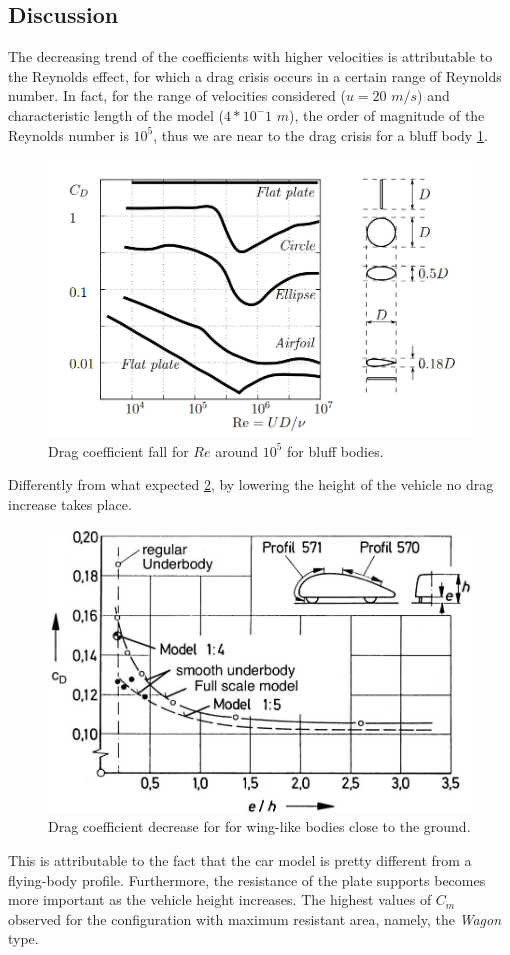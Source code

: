 \documentclass{elbioimp2}
\begin{document}
\subsection{Discussion}
The decreasing trend of the coefficients with higher velocities is attributable to the Reynolds effect, for which a drag crisis occurs in a certain range of Reynolds number. In fact, for the range of velocities considered ($u = 20$ $m/s$) and characteristic length of the model ($4*10^-1$ $m$), the order of magnitude of the Reynolds number is $10^5$, thus we are near to the drag crisis for a bluff body \cite{dragcrisis} \ref{dragcrisis}.
    \begin{figure}[htp]
        \centering
        \includegraphics[width=1\columnwidth]{dragcrisis.png}
        \caption{Drag coefficient fall for $Re$ around $10^5$ for bluff bodies.\label{dragcrisis}}
    \end{figure}
Differently from what expected \ref{ground}, by lowering the height of the vehicle no drag increase takes place. 
\begin{figure}[htp]
        \centering
        \includegraphics[width=1\columnwidth]{ground.png}
        \caption{Drag coefficient decrease for for wing-like bodies close to the ground.\label{ground}}
    \end{figure}
This is attributable to the fact that the car model is pretty different from a flying-body profile. Furthermore, the resistance of the plate supports becomes more important as the vehicle height increases. 
The highest values of $C_m$  observed for the configuration with maximum resistant area, namely, the \emph{Wagon} type.
\end{document}

